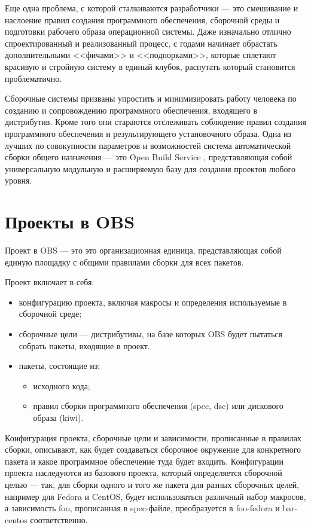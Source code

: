 \documentclass[10pt, a5paper]{article}
\begin{document}
Еще одна проблема, с которой сталкиваются разработчики --- это смешивание и наслоение правил создания программного обеспечения, сборочной среды и подготовки рабочего образа операционной системы. Даже изначально отлично спроектированный и реализованный процесс, с годами начинает обрастать дополнительными <<фичами>> и <<подпорками>>, которые сплетают красивую и стройную систему в единый клубок, распутать который становится проблематично.

Сборочные системы призваны упростить и минимизировать работу человека по созданию и сопровождению программного обеспечения, входящего в дистрибутив. Кроме того они стараются отслеживать соблюдение правил создания программного обеспечения и результирующего установочного образа. Одна из лучших по совокупности параметров и возможностей система автоматической сборки общего назначения --- это Open Build Service \cite{Pynkin1}, представляющая собой универсальную модульную и расширяемую базу для создания проектов любого уровня.

\section*{Проекты в OBS}

Проект в OBS --- это  это организационная единица, представляющая собой единую площадку с общими правилами сборки для всех пакетов.

Проект включает в себя:

\begin{itemize}
  \item конфигурацию проекта, включая макросы и определения используемые в сборочной среде;
  \item сборочные цели --- дистрибутивы, на базе которых OBS будет пытаться собрать пакеты,  входящие в проект.
  \item пакеты, состоящие из:
	  \begin{itemize}
		  \item исходного кода;
		  \item правил сборки программного обеспечения (spec, dsc) или дискового образа (kiwi).
	  \end{itemize}
\end{itemize}

Конфигурация проекта, сборочные цели и зависимости, прописанные в правилах сборки, описывают, как будет создаваться сборочное окружение для конкретного пакета и какое программное обеспечение туда будет входить.
Конфигурации проекта наследуются из базового проекта, который определяется сборочной целью --- так,  для сборки одного и того же пакета для разных сборочных целей, например для Fedora и CentOS, будет использоваться различный набор макросов, а зависимость foo, прописанная в spec-файле, преобразуется в foo-fedora и bar-centos соответственно.
\end{document}
